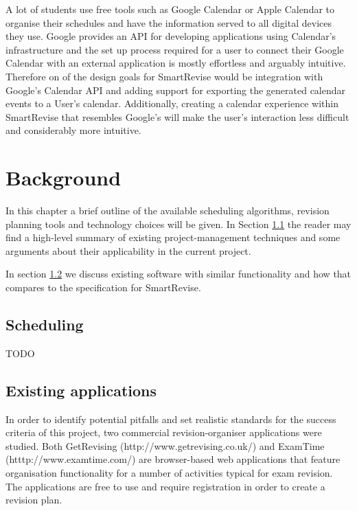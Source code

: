 \documentclass[bsc,frontabs,twoside,singlespacing,parskip]{infthesis}     %
\begin{document}
		A lot of students use free tools such as Google Calendar or Apple Calendar to organise their schedules and have the information served to all digital devices they use. Google provides an API for developing applications using Calendar's infrastructure and the set up process required for a user to connect their Google Calendar with an external application is mostly effortless and arguably intuitive. Therefore on of the design goals for SmartRevise would be integration with Google's Calendar API and adding support for exporting the generated calendar events to a User's calendar. Additionally, creating a calendar experience within SmartRevise that resembles Google's will make the user's interaction less difficult and considerably more intuitive.


\chapter{Background}

		In this chapter a brief outline of the available scheduling algorithms, revision planning tools and technology choices will be given. In Section \ref{scheduling} the reader may find a high-level summary of existing project-management techniques and some arguments about their applicability in the current project.
		
		In section \ref{apps} we discuss existing software with similar functionality and how that compares to the specification for SmartRevise.

	\section{Scheduling}\label{scheduling}
	
		TODO
	
	
	
	\section{Existing applications}\label{apps}
	
		In order to identify potential pitfalls and set realistic standards for the success criteria of this project, two commercial revision-organiser applications were studied. Both GetRevising (http://www.getrevising.co.uk/) and ExamTime (htttp://www.examtime.com/) are browser-based web applications that feature organisation functionality for a number of activities typical for exam revision. The applications are free to use and require registration in order to create a revision plan.
	
\end{document}
